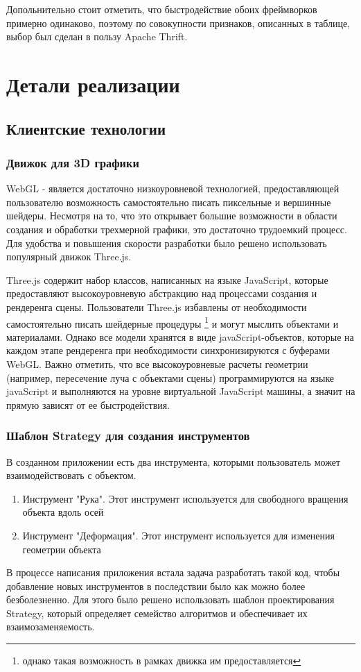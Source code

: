 \documentclass[12pt, a4paper]{article}
\let\stdsection\section
\renewcommand\section{\newpage\stdsection}
\begin{document}
Допольнительно стоит отметить, что быстродействие обоих фреймворков примерно
одинаково, поэтому по совокупности признаков, описанных в таблице, выбор был
сделан в пользу Apache Thrift.

\section{Детали реализации}
\subsection{Клиентские технологии}
\subsubsection{Движок для 3D графики}
WebGL - является достаточно низкоуровневой технологией, предоставляющей
пользователю возможность самостоятельно писать пиксельные и вершинные шейдеры.
Несмотря на то, что это открывает большие возможности в области создания и
обработки трехмерной графики, это достаточно трудоемкий процесс. Для
удобства и повышения скорости разработки было решено использовать популярный
движок Three.js.

Three.js содержит набор классов, написанных на языке JavaScript, которые
предоставляют высокоуровневую абстракцию над процессами создания и рендеренга
сцены. Пользователи Three.js избавлены от необходимости самостоятельно писать
шейдерные процедуры \footnote{однако такая возможность в рамках движка им
предоставляется} и могут мыслить объектами и материалами. Однако все модели
хранятся в виде javaScript-объектов, которые на каждом этапе рендеренга при
необходимости синхронизируются с буферами WebGL. Важно отметить, что все
высокоуровневые расчеты геометрии (например, пересечение луча с объектами сцены)
программируются на языке javaScript и выполняются на уровне виртуальной
JavaScript машины, а значит на прямую зависят от ее быстродействия.

\subsubsection{Шаблон Strategy для создания инструментов}
В созданном приложении есть два инструмента, которыми пользователь может
взаимодействовать с объектом.
\begin{enumerate}
    \item Инструмент "Рука". Этот инструмент используется для свободного
    вращения объекта вдоль осей
    \item Инструмент "Деформация". Этот инструмент используется для изменения
    геометрии объекта
\end{enumerate}
В процессе написания приложения встала задача разработать такой код, чтобы
добавление новых инструментов в последствии было как можно более безболезненно.
Для этого было решено использовать шаблон проектирования Strategy, который
определяет семейство алгоритмов и обеспечивает их взаимозаменяемость.
\end{document}

